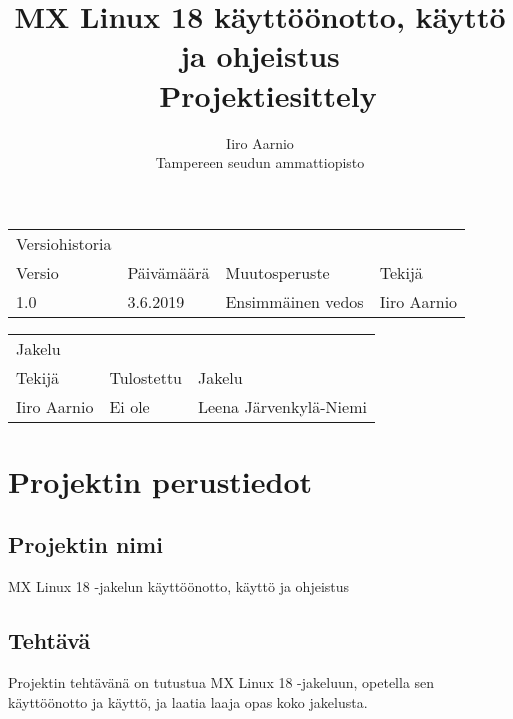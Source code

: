 \documentclass[a4paper, 12pt, finnish]{article}
\begin{document}
\title{MX Linux 18 käyttöönotto, käyttö ja ohjeistus \\ \large Projektiesittely}
\author{Iiro Aarnio\\ Tampereen seudun ammattiopisto}
\maketitle
\thispagestyle{empty}
\newpage
\thispagestyle{empty}
\newpage
\begin{table}[htpb]
\begin{tabular}{llll}
Versiohistoria &            &                         &             \\
\rowcolor[HTML]{FFCCC9}
Versio         & Päivämäärä & Muutosperuste           & Tekijä      \\
1.0              & 3.6.2019   & Ensimmäinen vedos       & Iiro Aarnio \\
\end{tabular}
\end{table}

\begin{table}[htpb]
\begin{tabular}{lll}
Jakelu &            &                                  \\
\rowcolor[HTML]{FFCCC9}
Tekijä         & Tulostettu & Jakelu                 \\
Iiro Aarnio              & Ei ole   & Leena Järvenkylä-Niemi \\
\end{tabular}
\end{table}
\newpage
\thispagestyle{empty}
\tableofcontents
\newpage
\section{Projektin perustiedot}

\subsection{Projektin nimi}

MX Linux 18 -jakelun käyttöönotto, käyttö ja ohjeistus

\subsection{Tehtävä}
Projektin tehtävänä on tutustua MX Linux 18 -jakeluun, opetella sen käyttöönotto ja käyttö, ja laatia laaja opas koko jakelusta.
\end{document}

